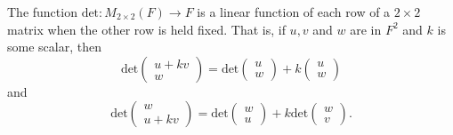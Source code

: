 \begin{theorem}
    The function \( \text{det}: {M}_{2 \times 2}(F) \to F  \) is a linear function of each row of a \( 2 \times 2  \) matrix when the other row is held fixed. That is, if \( u,v  \) and \( w  \) are in \( F^{2} \) and \( k  \) is some scalar, then
    \[  \text{det}\begin{pmatrix}
        u + kv \\
        w 
    \end{pmatrix} = \text{det}\begin{pmatrix}
        u \\
        w 
    \end{pmatrix}  + k \begin{pmatrix}
        u \\
        w 
    \end{pmatrix}  \] and 
    \[  \text{det} \begin{pmatrix}
        w \\
        u + kv
    \end{pmatrix} = \text{det}\begin{pmatrix}
        w \\
        u 
    \end{pmatrix} + k \text{det}\begin{pmatrix}
        w \\
        v
    \end{pmatrix}. \]
\end{theorem}

